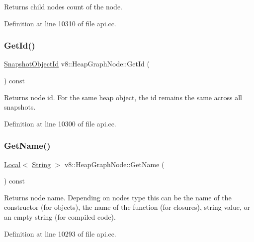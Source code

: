 Returns child nodes count of the node. 

Definition at line 10310 of file api.\+cc.

\mbox{\label{classv8_1_1HeapGraphNode_a62cd677be9c23067c6e2394b1fd154c6}} 
\subsubsection{\texorpdfstring{Get\+Id()}{GetId()}}
{\footnotesize\ttfamily \mbox{\hyperlink{classuint32__t}{Snapshot\+Object\+Id}} v8\+::\+Heap\+Graph\+Node\+::\+Get\+Id (\begin{DoxyParamCaption}{ }\end{DoxyParamCaption}) const}

Returns node id. For the same heap object, the id remains the same across all snapshots. 

Definition at line 10300 of file api.\+cc.

\mbox{\label{classv8_1_1HeapGraphNode_a030f9646498eec5f689c8f6c8fe09168}} 
\subsubsection{\texorpdfstring{Get\+Name()}{GetName()}}
{\footnotesize\ttfamily \mbox{\hyperlink{classv8_1_1Local}{Local}}$<$ \mbox{\hyperlink{classv8_1_1String}{String}} $>$ v8\+::\+Heap\+Graph\+Node\+::\+Get\+Name (\begin{DoxyParamCaption}{ }\end{DoxyParamCaption}) const}

Returns node name. Depending on node\textquotesingle{}s type this can be the name of the constructor (for objects), the name of the function (for closures), string value, or an empty string (for compiled code). 

Definition at line 10293 of file api.\+cc.

\mbox{\label{classv8_1_1HeapGraphNode_ad61965a12cabdc7a4eeeb7e6aade46ba}} 
